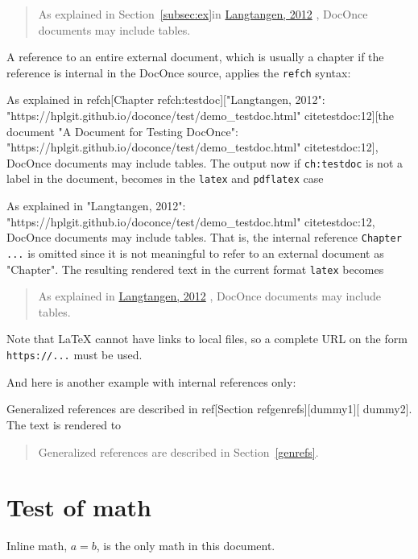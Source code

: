 \documentclass[%
oneside,                 %
final,                   %
chapterprefix=true,      %
open=right,              %
10pt]{book}
\makeatletter
\def\cleardoublepage{\clearpage\if@twoside \ifodd\c@page\else
\hbox{}
\thispagestyle{empty}
\newpage
\if@twocolumn\hbox{}\newpage\fi\fi\fi}
\newcommand{\clearemptydoublepage}{\clearpage{\pagestyle{empty}\cleardoublepage}}
\makeatother
\begin{document}
\begin{quote}
As explained in
Section~\ref{subsec:ex}in \href{{https://hplgit.github.io/doconce/test/demo_testdoc.html#subsec:ex}}{Langtangen, 2012}
\cite{testdoc:12}, DocOnce documents may include tables.
\end{quote}


A reference to an entire external document, which is usually a chapter
if the reference is internal in the DocOnce source, applies the
\texttt{refch} syntax:

\bccq
As explained in
refch[Chapter ref{ch:testdoc}]["Langtangen, 2012":
"https://hplgit.github.io/doconce/test/demo_testdoc.html"
cite{testdoc:12}][the document
"A Document for Testing DocOnce":
"https://hplgit.github.io/doconce/test/demo_testdoc.html"
cite{testdoc:12}], DocOnce documents may include tables.
\eccq
The output now if \texttt{ch:testdoc} is not a label in the document,
becomes in the \texttt{latex} and \texttt{pdflatex} case

\bccq
As explained in
"Langtangen, 2012":
"https://hplgit.github.io/doconce/test/demo_testdoc.html"
cite{testdoc:12}, DocOnce documents may include tables.
\eccq
That is, the internal reference \texttt{Chapter ...} is omitted since
it is not meaningful to refer to an external document as "Chapter".
The resulting rendered text in the current format \texttt{latex} becomes


\begin{quote}
As explained in
\href{{https://hplgit.github.io/doconce/test/demo_testdoc.html}}{Langtangen, 2012}
\cite{testdoc:12}, DocOnce documents may include tables.
\end{quote}


Note that {\LaTeX} cannot
have links to local files, so a complete URL on the form
\texttt{https://...} must be used.

And here is another example with internal references only:

\bccq
Generalized references are described in ref[Section ref{genrefs}][dummy1][
dummy2].
\eccq
The text is rendered to


\begin{quote}
Generalized references are described in
Section~\ref{genrefs}.
\end{quote}


\chapter{Test of math}


Inline math, $a=b$, is the only math in this document.

\clearemptydoublepage






\end{document}
